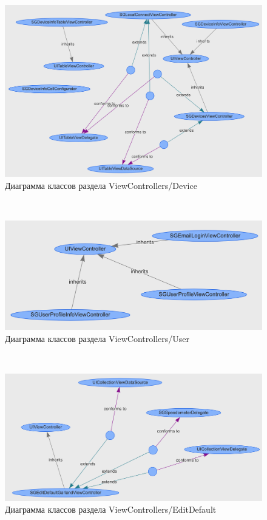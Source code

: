 ~
\begin{figure}[H]
\centering
	\includegraphics[scale=0.5]{figures/diagrams/class/vc_device.png}
	\caption{Диаграмма классов раздела ViewControllers/Device}
	\label{fig:appendices:classDiagram:vc_device}
\end{figure}
~
\begin{figure}[H]
\centering
	\includegraphics[scale=0.5]{figures/diagrams/class/vc_user.png}
	\caption{Диаграмма классов раздела ViewControllers/User}
	\label{fig:appendices:classDiagram:vc_user}
\end{figure}
~
\begin{figure}[H]
\centering
	\includegraphics[scale=0.5]{figures/diagrams/class/vc_editDefault.png}
	\caption{Диаграмма классов раздела ViewControllers/EditDefault}
	\label{fig:appendices:classDiagram:vc_editDefault}
\end{figure}
